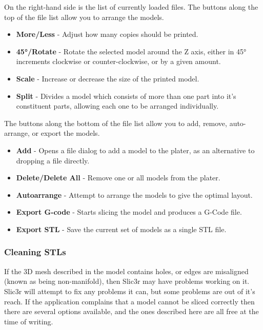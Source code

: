 On the right-hand side is the list of currently loaded files.  The buttons along the top of the file list allow you to arrange the models.
\begin{itemize}
	\item \textbf{More/Less}  - Adjust how many copies should be printed.
	\item \textbf{45°/Rotate}  - Rotate the selected model around the Z axis, either in 45° increments clockwise or counter-clockwise, or by a given amount.
	\item \textbf{Scale}  - Increase or decrease the size of the printed model.
	\item \textbf{Split}  - Divides a model which consists of more than one part into it's constituent parts, allowing each one to be arranged individually.
\end{itemize}

The buttons along the bottom of the file list allow you to add, remove, auto-arrange, or export the models.
\begin{itemize}
	\item \textbf{Add}  - Opens a file dialog to add a model to the plater, as an alternative to dropping a file directly.
	\item \textbf{Delete/Delete All}  - Remove one or all models from the plater.
	\item \textbf{Autoarrange}  - Attempt to arrange the models to give the optimal layout.
	\item \textbf{Export G-code}  - Starts slicing the model and produces a G-Code file.
	\item \textbf{Export STL}  - Save the current set of models as a single STL file.
\end{itemize}


\subsubsection{Cleaning STLs} %
\label{sub:cleaning_stls}
If the 3D mesh described in the model contains holes, or edges are misaligned (known as being non-manifold), then Slic3r may have problems working on it.  Slic3r will attempt to fix any problems it can, but some problems are out of it's reach.  If the application complains that a model cannot be sliced correctly then there are several options available, and the ones described here are all free at the time of writing. 



